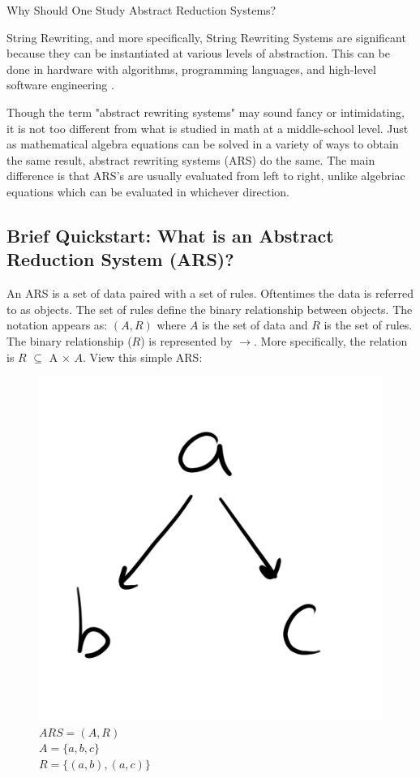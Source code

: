 \documentclass{article}
\begin{document}
\medskip\noindent
Why Should One Study Abstract Reduction Systems?

\medskip\noindent
String Rewriting, and more specifically, String Rewriting Systems are significant because they can be instantiated at various levels of abstraction. This can be done in hardware with algorithms, programming languages, and high-level software engineering \cite{RI}.

\medskip\noindent
Though the term "abstract rewriting systems" may sound fancy or intimidating, it is not too different from what is studied in math at a middle-school level. Just as mathematical algebra equations can be solved in a variety of ways to obtain the same result, abstract rewriting systems (ARS) do the same. The main difference is that ARS's are usually evaluated from left to right, unlike algebriac equations which can be evaluated in whichever direction.


\subsection{Brief Quickstart: What is an Abstract Reduction System (ARS)?}

\medskip\noindent
An ARS is a set of data paired with a set of rules. Oftentimes the data is referred to as objects. The set of rules define the binary relationship between objects. The notation appears as: $(A, R)$ where $A$ is the set of data and $R$ is the set of rules. The binary relationship ($R$) is represented by $\rightarrow$. More specifically, the relation is $R$ $\subseteq$ A $\times$ $A$. View this simple ARS:

\begin{figure}[H]
  \centering
  \includegraphics[scale=0.06]{gen1}
  \caption[] {
    $ARS = (A, R)$
    \\ $A = \{a, b, c\}$
    \\ $R = \{(a, b), (a, c)\}$
    \endtabular}
\end{figure}
\end{document}
